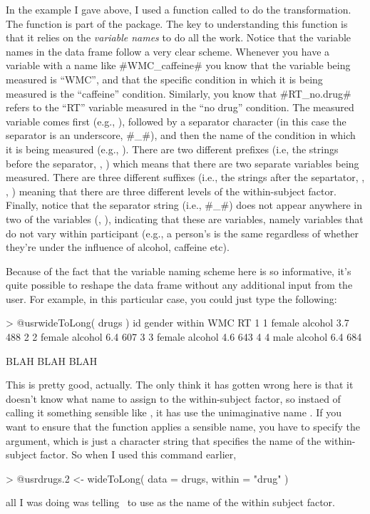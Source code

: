 In the example I gave above, I used a function called  to do the transformation. The  function is part of the  package. The key to understanding this function is that it relies on the {\it variable names} to do all the work. Notice that the variable names in the  data frame follow a very clear scheme. Whenever you have a variable with a name like \rtextverb#WMC_caffeine# you know that the variable being measured is ``WMC'', and that the specific condition in which it is being measured is the ``caffeine'' condition. Similarly, you know that \rtextverb#RT_no.drug# refers to the ``RT'' variable measured in the ``no drug'' condition. The measured variable comes first (e.g., ), followed by a separator character (in this case the separator is an underscore, \rtextverb#_#), and then the name of the condition in which it is being measured (e.g., ). There are two different prefixes (i.e, the strings before the separator, , ) which means that there are two separate variables being measured. There are three different suffixes (i.e., the strings after the separtator, , , ) meaning that there are three different levels of the within-subject factor. Finally, notice that the separator string (i.e., \rtextverb#_#) does not appear anywhere in two of the variables (, ), indicating that these are  variables, namely variables that do not vary within participant (e.g., a person's  is the same regardless of whether they're under the influence of alcohol, caffeine etc).

Because of the fact that the variable naming scheme here is so informative, it's quite possible to reshape the data frame without any additional input from the user. For example, in this particular case, you could just type the following:
\begin{rblock1}
> @usr{wideToLong( drugs )}
   id gender   within WMC  RT
1   1 female  alcohol 3.7 488
2   2 female  alcohol 6.4 607
3   3 female  alcohol 4.6 643
4   4   male  alcohol 6.4 684

BLAH BLAH BLAH
\end{rblock1}
This is pretty good, actually. The only think it has gotten wrong here is that it doesn't know what name to assign to the within-subject factor, so instaed of calling it something sensible like , it has use the unimaginative name . If you want to ensure that the  function applies a sensible name, you have to specify the  argument, which is just a character string that specifies the name of the within-subject factor. So when I used this command earlier,
\begin{rblock1}
> @usr{drugs.2 <- wideToLong( data = drugs, within = "drug" )}
\end{rblock1}
all I was doing was telling \R\ to use  as the name of the within subject factor. 

